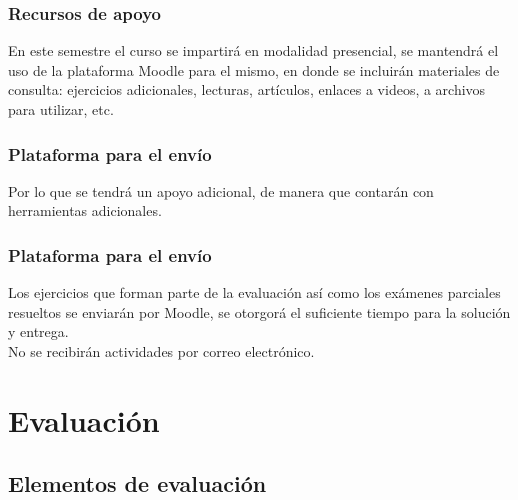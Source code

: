 \documentclass[12pt]{beamer}
\begin{document}
\begin{frame}
\frametitle{Recursos de apoyo}
En este semestre el curso se impartirá en modalidad presencial, \pause se mantendrá el uso de la plataforma Moodle para el mismo, en donde se incluirán materiales de consulta: ejercicios adicionales, lecturas, artículos, enlaces a videos, a archivos para utilizar, etc. 
\end{frame}
\begin{frame}
\frametitle{Plataforma para el envío}
Por lo que se tendrá un apoyo adicional, de manera que contarán con herramientas adicionales.
\end{frame}
\begin{frame}
\frametitle{Plataforma para el envío}
Los ejercicios que forman parte de la evaluación así como los exámenes parciales resueltos se enviarán por Moodle, se otorgorá el suficiente tiempo para la solución y entrega.
\\
\bigskip
\pause
No se recibirán actividades por correo electrónico.
\end{frame}

\section{Evaluación}
\subsection{Elementos de evaluación}
\end{document}
